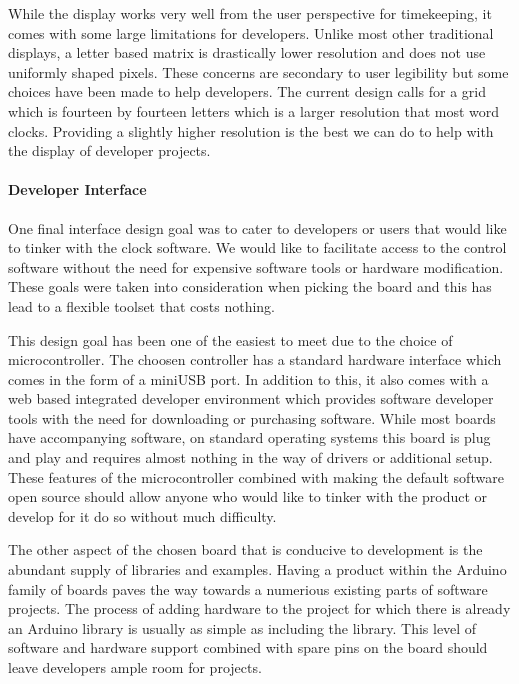 \documentclass[onecolumn, draftclsnofoot,10pt, compsoc]{IEEEtran}
\begin{document}
\vspace{2mm} While the display works very well from the user perspective for timekeeping, it comes with some large limitations for developers.
Unlike most other traditional displays, a letter based matrix is drastically lower resolution and does not use uniformly shaped pixels.
These concerns are secondary to user legibility but some choices have been made to help developers.
The current design calls for a grid which is fourteen by fourteen letters which is a larger resolution that most word clocks.
Providing a slightly higher resolution is the best we can do to help with the display of developer projects.

\vspace{1mm}
\paragraph{Developer Interface}

\vspace{2mm}
One final interface design goal was to cater to developers or users that would like to tinker with the clock software.
We would like to facilitate access to the control software without the need for expensive software tools or hardware modification.
These goals were taken into consideration when picking the board and this has lead to a flexible toolset that costs nothing.

\vspace{2mm}
This design goal has been one of the easiest to meet due to the choice of microcontroller.
The choosen controller has a standard hardware interface which comes in the form of a miniUSB port.
In addition to this, it also comes with a web based integrated developer environment which provides software developer tools with the need for downloading or purchasing software.
While most boards have accompanying software, on standard operating systems this board is plug and play and requires almost nothing in the way of drivers or additional setup.
These features of the microcontroller combined with making the default software open source should allow anyone who would like to tinker with the product or develop for it do so without much difficulty.

The other aspect of the chosen board that is conducive to development is the abundant supply of libraries and examples.
Having a product within the Arduino family of boards paves the way towards a numerious existing parts of software projects.
The process of adding hardware to the project for which there is already an Arduino library is usually as simple as including the library.
This level of software and hardware support combined with spare pins on the board should leave developers ample room for projects.
\end{document}
